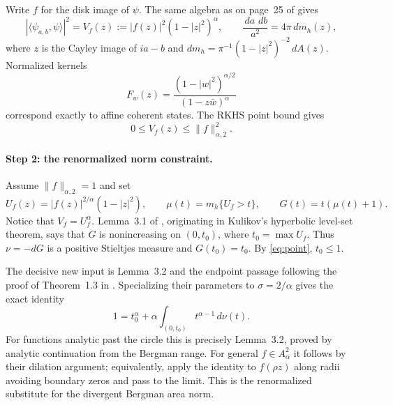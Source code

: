 \documentclass[11pt]{article}
\newcommand{\dd}{\,d}
\begin{document}
Write $f$ for the disk image of $\psi$.  The same algebra as on page~25 of
\cite{Frank} gives
\begin{equation}\label{eq:disk}
 |\langle\psi_{a,b},\psi\rangle|^2
   =V_f(z):=|f(z)|^2(1-|z|^2)^\alpha,
 \qquad
 \frac{\dd a\,\dd b}{a^2}=4\pi\,dm_h(z),
\end{equation}
where $z$ is the Cayley image of $ia-b$ and
$dm_h=\pi^{-1}(1-|z|^2)^{-2}\dd A(z)$.  Normalized kernels
\[
 F_w(z)=\frac{(1-|w|^2)^{\alpha/2}}{(1-z\bar w)^\alpha}
\]
correspond exactly to affine coherent states.  The RKHS point bound gives
\begin{equation}\label{eq:point}
 0\leq V_f(z)\leq\|f\|_{\alpha,2}^2.
\end{equation}

\paragraph{Step 2: the renormalized norm constraint.}
Assume $\|f\|_{\alpha,2}=1$ and set
\[
 U_f(z)=|f(z)|^{2/\alpha}(1-|z|^2),\qquad
 \mu(t)=m_h\{U_f>t\},\qquad G(t)=t(\mu(t)+1).
\]
Notice that $V_f=U_f^\alpha$.  Lemma~3.1 of \cite{BKSZ}, originating in
Kulikov's hyperbolic level-set theorem, says that $G$ is nonincreasing on
$(0,t_0)$, where $t_0=\max U_f$.  Thus $\nu=-dG$ is a positive Stieltjes
measure and $G(t_0)=t_0$.  By \eqref{eq:point}, $t_0\leq1$.

The decisive new input is Lemma~3.2 and the endpoint passage following the
proof of Theorem~1.3 in \cite{BKSZ}.  Specializing their parameters to
$\sigma=2/\alpha$ gives the exact identity
\begin{equation}\label{eq:normid}
 1=t_0^\alpha+\alpha\int_{(0,t_0)}t^{\alpha-1}\dd\nu(t).
\end{equation}
For functions analytic past the circle this is precisely Lemma~3.2, proved by
analytic continuation from the Bergman range.  For general $f\in A^2_\alpha$
it follows by their dilation argument; equivalently, apply the identity to
$f(\rho z)$ along radii avoiding boundary zeros and pass to the limit.  This
is the renormalized substitute for the divergent Bergman area norm.
\end{document}
